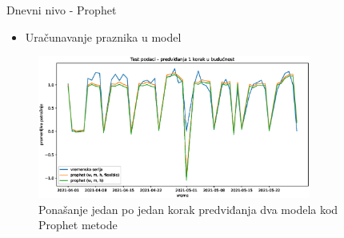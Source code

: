 \documentclass{beamer}
\begin{document}
\begin{frame}{Dnevni nivo - Prophet}
\begin{itemize}
    \item Uračunavanje praznika u model
\end{itemize}    
\vspace{-8px}
\begin{table}
\centering
\caption{Prophet metrike evaluacije}
\vspace{-8px}
\label{tbl: prophet_dnevni}
\end{table}
\vspace{-12px}
\begin{figure}[!ht]
  \centering
  \includegraphics[width=0.8\textwidth]{./images/grafici/test_dnevni_prophet.eps}
  \caption{Ponašanje jedan po jedan korak predviđanja dva modela kod Prophet metode}
  \label{fig: test_prophet}
\end{figure}

\end{frame}
\end{document}
